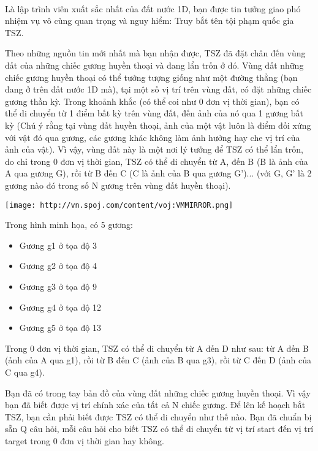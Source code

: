  

Là lập trình viên xuất sắc nhất của đất nước 1D, bạn được tin tưởng giao phó nhiệm vụ vô cùng quan trọng và nguy hiểm: Truy bắt tên tội phạm quốc gia TSZ.

Theo những nguồn tin mới nhất mà bạn nhận được, TSZ đã đặt chân đến vùng đất của những chiếc gương huyền thoại và đang lẩn trốn ở đó. Vùng đất những chiếc gương huyền thoại có thể tưởng tượng giống như một đường thẳng (bạn đang ở trên đất nước 1D mà), tại một số vị trí trên vùng đất, có đặt những chiếc gương thần kỳ. Trong khoảnh khắc (có thể coi như 0 đơn vị thời gian), bạn có thể di chuyển từ 1 điểm bất kỳ trên vùng đất, đến ảnh của nó qua 1 gương bất kỳ (Chú ý rằng tại vùng đất huyền thoại, ảnh của một vật luôn là điểm đối xứng với vật đó qua gương, các gương khác không làm ảnh hưởng hay che vị trí của ảnh của vật). Vì vậy, vùng đất này là một nơi lý tưởng để TSZ có thể lẩn trốn, do chỉ trong 0 đơn vị thời gian, TSZ có thể di chuyển từ A, đến B (B là ảnh của A qua gương G), rồi từ B đến C (C là ảnh của B qua gương G')... (với G, G' là 2 gương nào đó trong số N gương trên vùng đất huyền thoại).


\texttt{[image: http://vn.spoj.com/content/voj:VMMIRROR.png]}

Trong hình minh họa, có 5 gương:
\begin{itemize}
	\item Gương g1 ở tọa độ 3
	\item Gương g2 ở tọa độ 4
	\item Gương g3 ở tọa độ 9
	\item Gương g4 ở tọa độ 12
	\item Gương g5 ở tọa độ 13
\end{itemize}

Trong 0 đơn vị thời gian, TSZ có thể di chuyển từ A đến D như sau: từ A đến B (ảnh của A qua g1), rồi từ B đến C (ảnh của B qua g3), rồi từ C đến D (ảnh của C qua g4).

Bạn đã có trong tay bản đồ của vùng đất những chiếc gương huyền thoại. Vì vậy bạn đã biết được vị trí chính xác của tất cả N chiếc gương. Để lên kế hoạch bắt TSZ, bạn cần phải biết được TSZ có thể di chuyển như thế nào. Bạn đã chuẩn bị sẵn Q câu hỏi, mỗi câu hỏi cho biết TSZ có thể di chuyển từ vị trí start đến vị trí target trong 0 đơn vị thời gian hay không.